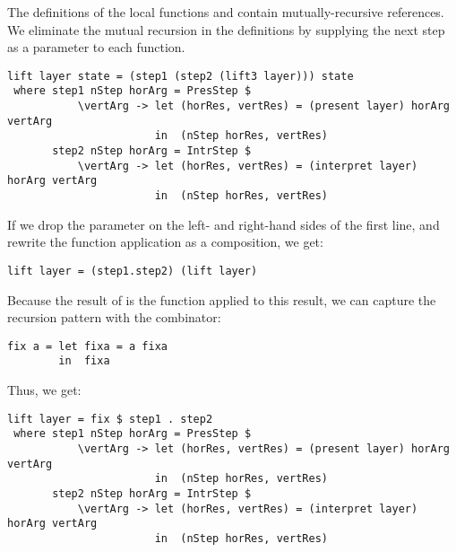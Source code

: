\documentclass[preprint,natbib]{sigplanconf}
\begin{document}
The definitions of the local functions  and  contain mutually-recursive references. We eliminate the mutual recursion in the definitions by supplying the next step as a parameter to each function.

      
      
\begin{small} %
\begin{verbatim}
lift layer state = (step1 (step2 (lift3 layer))) state
 where step1 nStep horArg = PresStep $ 
           \vertArg -> let (horRes, vertRes) = (present layer) horArg vertArg                                         
                       in  (nStep horRes, vertRes)
       step2 nStep horArg = IntrStep $
           \vertArg -> let (horRes, vertRes) = (interpret layer) horArg vertArg                     
                       in  (nStep horRes, vertRes)
\end{verbatim}
\end{small}

If we drop the  parameter on the left- and right-hand sides of the first line, and rewrite the function application as a composition, we get:
\
\begin{small}
\begin{verbatim}
lift layer = (step1.step2) (lift layer)
\end{verbatim}
\end{small}

Because the result of  is the function  applied to this result, we can capture the recursion pattern with  the  combinator:

\begin{small}
\begin{verbatim}
fix a = let fixa = a fixa
        in  fixa
\end{verbatim}
\end{small}

Thus, we get:

\begin{small} %
\begin{verbatim}
lift layer = fix $ step1 . step2 
 where step1 nStep horArg = PresStep $ 
           \vertArg -> let (horRes, vertRes) = (present layer) horArg vertArg                                         
                       in  (nStep horRes, vertRes)
       step2 nStep horArg = IntrStep $
           \vertArg -> let (horRes, vertRes) = (interpret layer) horArg vertArg                     
                       in  (nStep horRes, vertRes)
\end{verbatim}
\end{small}
\end{document}
